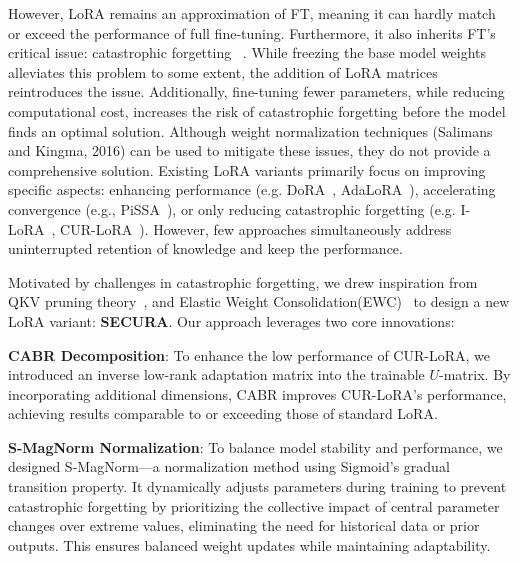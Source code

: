 However, LoRA remains an approximation of FT, meaning it can hardly match or exceed the performance of full fine-tuning. Furthermore, it also inherits FT's critical issue: catastrophic forgetting~\citep {MCCLOSKEY1989109} . While freezing the base model weights alleviates this problem to some extent, the addition of LoRA matrices reintroduces the issue. Additionally, fine-tuning fewer parameters, while reducing computational cost, increases the risk of catastrophic forgetting before the model finds an optimal solution. Although weight normalization techniques (Salimans and Kingma, 2016) can be used to mitigate these issues, they do not provide a comprehensive solution. Existing LoRA variants primarily focus on improving specific aspects: enhancing performance (e.g. DoRA~\citep{liu2024doraweightdecomposedlowrankadaptation}, AdaLoRA~\citep{zhang2023adaloraadaptivebudgetallocation}), accelerating convergence (e.g., PiSSA~\citep{meng2024pissaprincipalsingularvalues}), or only reducing catastrophic forgetting (e.g. I-LoRA~\citep{ren2024analyzingreducingcatastrophicforgetting}, CUR-LoRA~\citep{https://doi.org/10.5281/zenodo.12730055}). However, few approaches simultaneously address uninterrupted retention of knowledge and keep the performance.

Motivated by challenges in catastrophic forgetting, we drew inspiration from QKV pruning theory~\citep{lv2024kvprunerstructuralpruningfaster}, and Elastic Weight Consolidation(EWC)~\citep{aich2021elasticweightconsolidationewc} to design a new LoRA variant: \textbf{SECURA}. Our approach leverages two core innovations:

\begin{compactitem}
    \item \textbf{CABR Decomposition}: To enhance the low performance of CUR-LoRA, we introduced an inverse low-rank adaptation matrix into the trainable $U$-matrix. By incorporating additional dimensions, CABR improves CUR-LoRA's performance, achieving results comparable to or exceeding those of standard LoRA.
    \item \textbf{S-MagNorm Normalization}: To balance model stability and performance, we designed S-MagNorm—a normalization method using Sigmoid's gradual transition property. It dynamically adjusts parameters during training to prevent catastrophic forgetting by prioritizing the collective impact of central parameter changes over extreme values, eliminating the need for historical data or prior outputs. This ensures balanced weight updates while maintaining adaptability.
    \newline
\end{compactitem}

